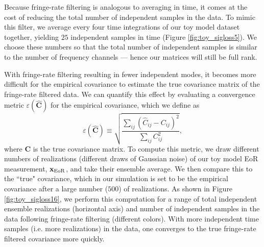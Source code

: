 \documentclass[preprint2,numberedappendix,tighten]{aastex6}  %
\newcommand{\C}{\mathbf{C}}
\newcommand{\Chat}{\mathbf{\widehat{C}}}
\newcommand{\cc}[1]{{\color{purple} \textbf{[CC: #1]}}}
\begin{document}
Because fringe-rate filtering is analogous to averaging in time, it comes at the cost of reducing the total number of independent samples in the data. To mimic this filter, we average every four time integrations of our toy model dataset together, yielding $25$ independent samples in time (Figure \ref{fig:toy_sigloss5}). We choose these numbers so that the total number of independent samples is similar to the number of frequency channels --- hence our matrices will still be full rank.

With fringe-rate filtering resulting in fewer independent modes, it becomes more difficult for the empirical covariance to estimate the true covariance matrix of the fringe-rate filtered data. We can quantify this effect by evaluating a convergence metric $\varepsilon(\Chat)$ for the empirical covariance, which we define as
\begin{equation}
\label{eq:converge}
\varepsilon (\Chat) \equiv \sqrt{\frac{\sum_{ij} (\widehat{C}_{ij} - {C}_{ij})^2}{\sum_{ij} {C}_{ij}^2}},
\end{equation}
where $\C$ is the true covariance matrix. To compute this metric, we draw different numbers of realizations (different draws of Gaussian noise) of our toy model EoR measurement, $\textbf{x}_{\rm EoR}$, and take their ensemble average. We then compare this to the ``true" covariance, which in our simulation is set to be the empirical covariance after a large number ($500$) of realizations. As shown in Figure \ref{fig:toy_sigloss16}, we perform this computation for a range of total independent ensemble realizations (horizontal axis) and number of independent samples in the data following fringe-rate filtering (different colors). With more independent time samples (i.e. more realizations) in the data, one converges to the true fringe-rate filtered covariance more quickly. 
\end{document}
